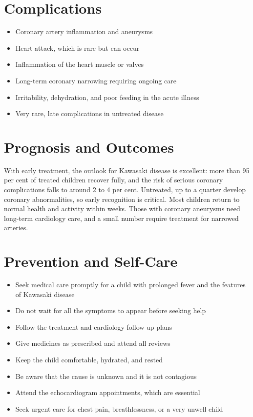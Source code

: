 \section*{Complications}
\begin{itemize}
    \item Coronary artery inflammation and aneurysms
    \item Heart attack, which is rare but can occur
    \item Inflammation of the heart muscle or valves
    \item Long-term coronary narrowing requiring ongoing care
    \item Irritability, dehydration, and poor feeding in the acute illness
    \item Very rare, late complications in untreated disease
\end{itemize}

\section*{Prognosis and Outcomes}
With early treatment, the outlook for Kawasaki disease is excellent: more than 95 per cent of treated children recover fully, and the risk of serious coronary complications falls to around 2 to 4 per cent. Untreated, up to a quarter develop coronary abnormalities, so early recognition is critical. Most children return to normal health and activity within weeks. Those with coronary aneurysms need long-term cardiology care, and a small number require treatment for narrowed arteries.

\section*{Prevention and Self-Care}
\begin{itemize}
    \item Seek medical care promptly for a child with prolonged fever and the features of Kawasaki disease
    \item Do not wait for all the symptoms to appear before seeking help
    \item Follow the treatment and cardiology follow-up plans
    \item Give medicines as prescribed and attend all reviews
    \item Keep the child comfortable, hydrated, and rested
    \item Be aware that the cause is unknown and it is not contagious
    \item Attend the echocardiogram appointments, which are essential
    \item Seek urgent care for chest pain, breathlessness, or a very unwell child
\end{itemize}

